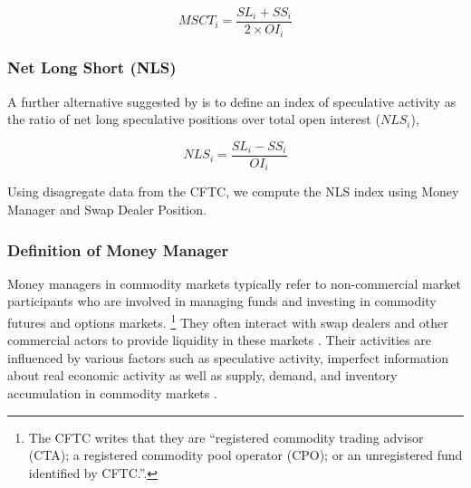 \begin{equation} \label{eqn:MSCT}
MSCT_i=\frac{SL_i+SS_i}{2 \times OI_i}
\end{equation}



\subsubsection{Net Long Short (NLS)}
A further alternative suggested by \citet{hedegaard2011margins} is to define an index of speculative activity as the ratio of net long speculative positions over total open interest ($NLS_i$),

\begin{equation} \label{eqn:NLS}
NLS_i=\frac{SL_i-SS_i}{OI_i}
\end{equation}

Using disagregate data from the CFTC, we compute the NLS index using Money Manager and Swap Dealer Position. 
\subsubsection*{Definition of Money Manager}
Money managers in commodity markets typically refer to non-commercial market participants who are involved in managing funds and investing in commodity futures and options markets. \cite{zhang2022}\footnote{The CFTC writes that they are ``registered commodity trading advisor (CTA); a registered commodity pool operator (CPO); or an unregistered fund identified by CFTC.''.} They often interact with swap dealers and other commercial actors to provide liquidity in these markets \cite{zhang2022}. Their activities are influenced by various factors such as speculative activity, imperfect information about real economic activity as well as supply, demand, and inventory accumulation in  commodity markets \citep{singleton2014}. 

